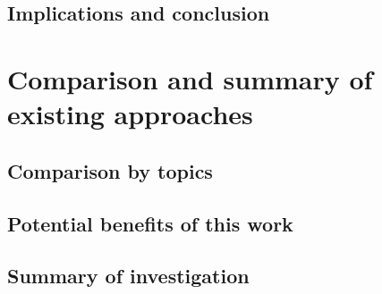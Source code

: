 \subsection{Implications and conclusion}


\section{Comparison and summary of existing approaches}

\subsection{Comparison by topics}

\subsection{Potential benefits of this work}

\subsection{Summary of investigation}


